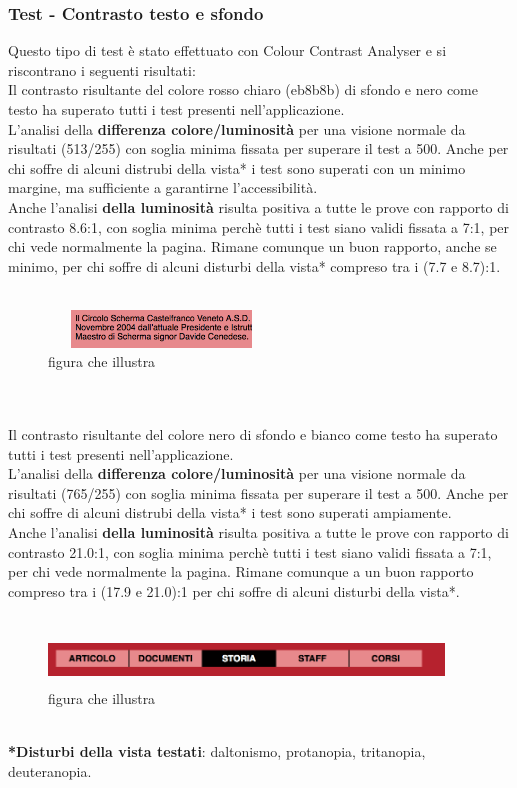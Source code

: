 	\subsubsection {Test - Contrasto testo e sfondo}
	Questo tipo di test \`e  stato effettuato con Colour Contrast Analyser e si riscontrano i seguenti risultati:
	\\ Il contrasto risultante del colore rosso chiaro (eb8b8b) di sfondo e nero come testo ha superato tutti i test presenti nell'applicazione.
	\\ L'analisi della \textbf{differenza colore/luminosit\`a} per una visione normale da risultati (513/255) con soglia minima fissata per superare il test a 500. Anche per chi soffre di alcuni distrubi della vista* i test sono superati con un minimo margine, ma sufficiente a garantirne l'accessibilit\`a.
	\\ Anche l'analisi \textbf{della luminosit\`a} risulta positiva a tutte le prove con rapporto di contrasto 8.6:1, con soglia minima perchè tutti i test siano validi fissata a 7:1, per chi vede normalmente la pagina. Rimane comunque un buon rapporto, anche se minimo,  per chi soffre di alcuni disturbi della vista* compreso tra i (7.7 e 8.7):1.
	\\ \\ 
	\begin{figure}[htbp]
		\centering
		\includegraphics[width=60mm, height=10mm]{images/contrasto_testo.png}
		\caption{figura che illustra}
	\end{figure}
	\\
	\\Il contrasto risultante del colore nero di sfondo e bianco come testo ha superato tutti i test presenti nell'applicazione.
	\\ L'analisi della \textbf{differenza colore/luminosit\`a} per una visione normale da risultati (765/255) con soglia minima fissata per superare il test a 500. Anche per chi soffre di alcuni distrubi della vista* i test sono superati ampiamente.
	\\ Anche l'analisi \textbf{della luminosit\`a} risulta positiva a tutte le prove con rapporto di contrasto 21.0:1, con soglia minima perchè tutti i test siano validi fissata a 7:1, per chi vede normalmente la pagina. Rimane comunque a un buon rapporto compreso tra i (17.9 e 21.0):1 per chi soffre di alcuni disturbi della vista*.
	\\ \\ 
	\begin{figure}[htbp]
		\centering
		\includegraphics[width=105mm, height=13mm]{images/contrasto_menu.png}
		\caption{figura che illustra}
	\end{figure}
	\\ \textbf{*Disturbi della vista testati}: daltonismo, protanopia, tritanopia, deuteranopia.

